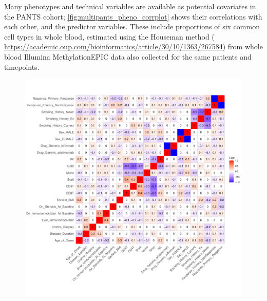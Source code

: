\begin{outline}
Many phenotypes and technical variables are available as potential covariates in the \gls{PANTS} cohort;
\autoref{fig:multipants_pheno_corrplot} shows their correlations with each other, and the predictor variables.
These include proportions of six common cell types in whole blood, 
estimated using the Houseman method ( \url{https://academic.oup.com/bioinformatics/article/30/10/1363/267584}) 
from whole blood Illumina MethylationEPIC data also collected for the same patients and timepoints.

\begin{figure}
    \centering
    \includegraphics[width=1.0\textwidth,page=1]{mainmatter/figures/chapter_04/process_pheno.pheno_filtered_dge.ggcorrplot.pdf}
    \caption{}
    \label{fig:multipants_pheno_corrplot}
\end{figure}


\end{outline}
